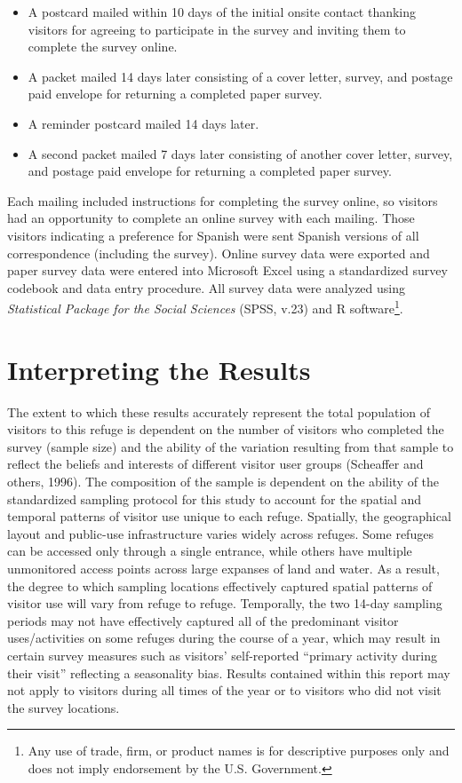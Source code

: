 \documentclass[]{book}
\providecommand{\tightlist}{%
  \setlength{\itemsep}{0pt}\setlength{\parskip}{0pt}}
\let\rmarkdownfootnote\footnote%
\def\footnote{\protect\rmarkdownfootnote}
\begin{document}
\begin{itemize}
\tightlist
\item
  A postcard mailed within 10 days of the initial onsite contact
  thanking visitors for agreeing to participate in the survey and
  inviting them to complete the survey online.
\item
  A packet mailed 14 days later consisting of a cover letter, survey,
  and postage paid envelope for returning a completed paper survey.
\item
  A reminder postcard mailed 14 days later.
\item
  A second packet mailed 7 days later consisting of another cover
  letter, survey, and postage paid envelope for returning a completed
  paper survey.
\end{itemize}

Each mailing included instructions for completing the survey online, so
visitors had an opportunity to complete an online survey with each
mailing. Those visitors indicating a preference for Spanish were sent
Spanish versions of all correspondence (including the survey). Online
survey data were exported and paper survey data were entered into
Microsoft Excel using a standardized survey codebook and data entry
procedure. All survey data were analyzed using \emph{Statistical Package
for the Social Sciences} (SPSS, v.23) and R software\footnote{Any use of
  trade, firm, or product names is for descriptive purposes only and
  does not imply endorsement by the U.S. Government.}.

\section{Interpreting the Results}\label{interpreting-the-results-1}

The extent to which these results accurately represent the total
population of visitors to this refuge is dependent on the number of
visitors who completed the survey (sample size) and the ability of the
variation resulting from that sample to reflect the beliefs and
interests of different visitor user groups (Scheaffer and others, 1996).
The composition of the sample is dependent on the ability of the
standardized sampling protocol for this study to account for the spatial
and temporal patterns of visitor use unique to each refuge. Spatially,
the geographical layout and public-use infrastructure varies widely
across refuges. Some refuges can be accessed only through a single
entrance, while others have multiple unmonitored access points across
large expanses of land and water. As a result, the degree to which
sampling locations effectively captured spatial patterns of visitor use
will vary from refuge to refuge. Temporally, the two 14-day sampling
periods may not have effectively captured all of the predominant visitor
uses/activities on some refuges during the course of a year, which may
result in certain survey measures such as visitors' self-reported
``primary activity during their visit'' reflecting a seasonality bias.
Results contained within this report may not apply to visitors during
all times of the year or to visitors who did not visit the survey
locations.
\end{document}
